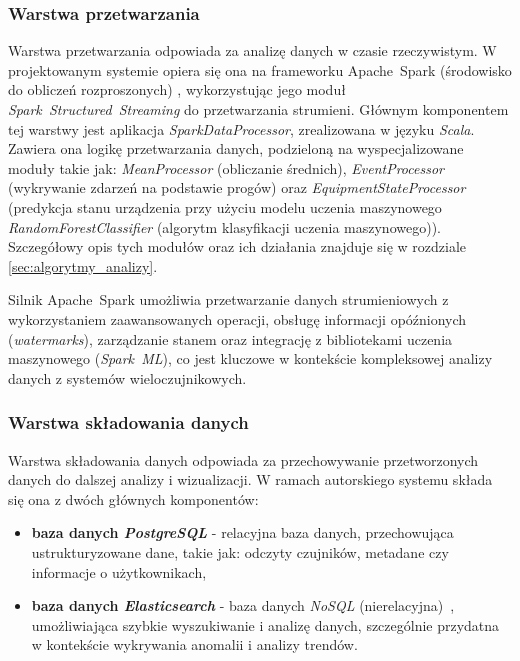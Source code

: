 \subsubsection{Warstwa przetwarzania}
\label{subsubsec:warstwa_przetwarzania}

Warstwa przetwarzania odpowiada za analizę danych w czasie rzeczywistym. W projektowanym systemie opiera się ona na frameworku \mbox{Apache Spark} (środowisko do obliczeń rozproszonych) \cite{spark_streaming}, wykorzystując jego moduł \mbox{\textit{Spark Structured Streaming}} do przetwarzania strumieni. Głównym komponentem tej warstwy jest aplikacja \textit{SparkDataProcessor}, zrealizowana w języku \textit{Scala}. Zawiera ona logikę przetwarzania danych, podzieloną na wyspecjalizowane moduły takie jak: \textit{MeanProcessor} (obliczanie średnich), \textit{EventProcessor} (wykrywanie zdarzeń na podstawie progów) oraz \textit{EquipmentStateProcessor} (predykcja stanu urządzenia przy użyciu modelu uczenia maszynowego \textit{RandomForestClassifier} (algorytm klasyfikacji uczenia maszynowego)). Szczegółowy opis tych modułów oraz ich działania znajduje się w rozdziale \ref{sec:algorytmy_analizy}.

Silnik \mbox{Apache Spark} umożliwia przetwarzanie danych strumieniowych z wykorzystaniem zaawansowanych operacji, obsługę informacji opóźnionych (\textit{watermarks}), zarządzanie stanem oraz integrację z bibliotekami uczenia maszynowego (\mbox{\textit{Spark ML}}), co jest kluczowe w kontekście kompleksowej analizy danych z systemów wieloczujnikowych.

\newpage


\subsubsection{Warstwa składowania danych}
\label{subsubsec:warstwa_skladowania}

Warstwa składowania danych odpowiada za przechowywanie przetworzonych danych do dalszej analizy i wizualizacji. W ramach autorskiego systemu składa się ona z dwóch głównych komponentów:

\begin{itemize}
    \item \textbf{baza danych \textit{PostgreSQL}} - relacyjna baza danych, przechowująca ustrukturyzowane dane, takie jak: odczyty czujników, metadane czy informacje o użytkownikach,
    \item \textbf{baza danych \textit{Elasticsearch}} - baza danych \mbox{\textit{NoSQL}} (nierelacyjna)~\cite{nosql_definition}, umożliwiająca szybkie wyszukiwanie i analizę danych, szczególnie przydatna w kontekście wykrywania anomalii i analizy trendów.
\end{itemize}


